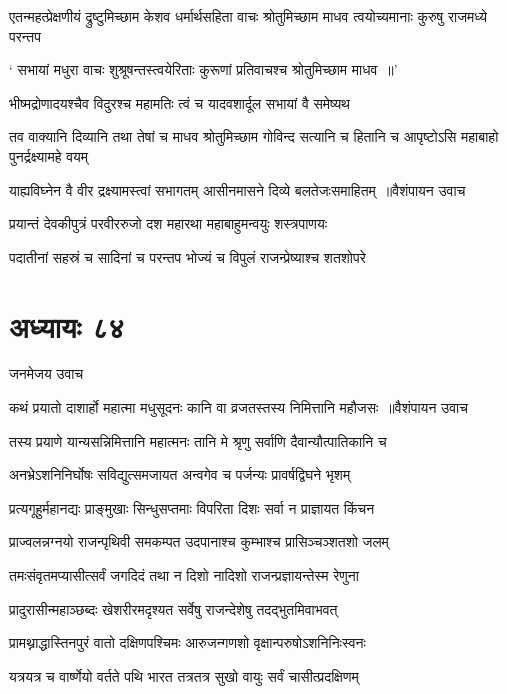 एतन्महत्प्रेक्षणीयं द्रुष्टुमिच्छाम केशव
\twolineshloka
{धर्मार्थसहिता वाचः श्रोतुमिच्छाम माधव}
{त्वयोच्यमानाः कुरुषु राजमध्ये परन्तप}


\twolineshloka
{` सभायां मधुरा वाचः शुश्रूषन्तस्त्वयेरिताः}
{कुरूणां प्रतिवाचश्च श्रोतुमिच्छाम माधव ॥'}


\twolineshloka
{भीष्मद्रोणादयश्चैव विदुरश्च महामतिः}
{त्वं च यादवशार्दूल सभायां वै समेष्यथ}


\threelineshloka
{तव वाक्यानि दिव्यानि तथा तेषां च माधव}
{श्रोतुमिच्छाम गोविन्द सत्यानि च हितानि च}
{आपृष्टोऽसि महाबाहो पुनर्द्रक्ष्यामहे वयम्}


\threelineshloka
{याह्यविघ्नेन वै वीर द्रक्ष्यामस्त्वां सभागतम्}
{आसीनमासने दिव्ये बलतेजःसमाहितम् ॥वैशंपायन उवाच}
{}


\twolineshloka
{प्रयान्तं देवकीपुत्रं परवीररुजो दश}
{महारथा महाबाहुमन्वयुः शस्त्रपाणयः}


\twolineshloka
{पदातीनां सहस्रं च सादिनां च परन्तप}
{भोज्यं च विपुलं राजन्प्रेष्याश्च शतशोपरे}


\chapter{अध्यायः ८४}
\twolineshloka
{जनमेजय उवाच}
{}


\threelineshloka
{कथं प्रयातो दाशार्हो महात्मा मधुसूदनः}
{कानि वा व्रजतस्तस्य निमित्तानि महौजसः ॥वैशंपायन उवाच}
{}


\twolineshloka
{तस्य प्रयाणे यान्यसन्निमित्तानि महात्मनः}
{तानि मे श्रृणु सर्वाणि दैवान्यौत्पातिकानि च}


\twolineshloka
{अनभ्रेऽशनिनिर्घोषः सविद्युत्समजायत}
{अन्वगेव च पर्जन्यः प्रावर्षद्विघने भृशम्}


\twolineshloka
{प्रत्यगूहुर्महानद्यः प्राङ्मुखाः सिन्धुसप्तमाः}
{विपरिता दिशः सर्वा न प्राज्ञायत किंचन}


\twolineshloka
{प्राज्वलन्नग्नयो राजन्पृथिवी समकम्पत}
{उदपानाश्च कुम्भाश्च प्रासिञ्चञ्शतशो जलम्}


\twolineshloka
{तमःसंवृतमप्यासीत्सर्वं जगदिदं तथा}
{न दिशो नादिशो राजन्प्रज्ञायन्तेस्म रेणुना}


\twolineshloka
{प्रादुरासीन्महाञ्छब्दः खेशरीरमदृश्यत}
{सर्वेषु राजन्देशेषु तदद्भुतमिवाभवत्}


\twolineshloka
{प्रामथ्नाद्धास्तिनपुरं वातो दक्षिणपश्चिमः}
{आरुजन्गणशो वृक्षान्परुषोऽशनिनिःस्वनः}


\twolineshloka
{यत्रयत्र च वार्ष्णेयो वर्तते पथि भारत}
{तत्रतत्र सुखो वायुः सर्वं चासीत्प्रदक्षिणम्}


